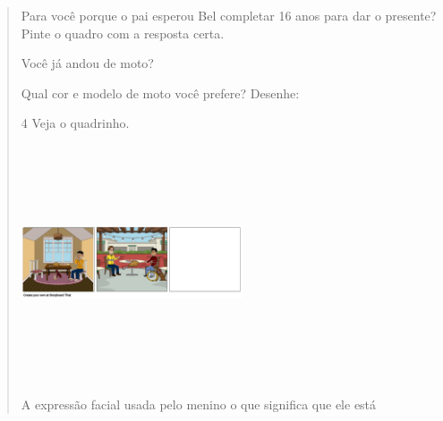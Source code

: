 \begin{verse}

\begin{escolha}
\item Para você porque o pai esperou Bel completar 16 anos para dar o
presente? Pinte o quadro com a resposta certa.


\item Você já andou de moto?


\item Qual cor e modelo de moto você prefere? Desenhe:

\begin{mdframed}[linewidth=2pt,linecolor=salmao,roundcorner=10pt]
\vspace{5cm}
\end{mdframed}
\end{escolha}

\num{4} Veja o quadrinho.

\includegraphics[width=2.57222in,height=2.73403in]{media/image131.png}


\begin{escolha}
\item A expressão facial usada pelo menino o que significa que ele está

\end{escolha}
\end{verse}
